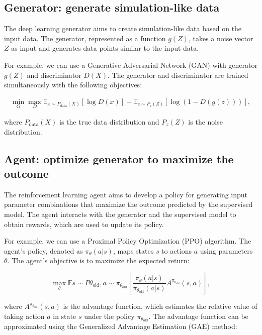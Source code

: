 \documentclass{article}
\begin{document}
\subsection{Generator: generate simulation-like data}

The deep learning generator aims to create simulation-like data based on the input data. The generator, represented as a function $g(Z)$, takes a noise vector $Z$ as input and generates data points similar to the input data.

For example, we can use a Generative Adversarial Network (GAN) with generator $g(Z)$ and discriminator $D(X)$. The generator and discriminator are trained simultaneously with the following objectives:

\begin{align}
    \min_G \max_D \mathbb{E}_{x \sim P_\text{data}(X)}[\log D(x)] + \mathbb{E}_{z \sim P_z(Z)}[\log (1 - D(g(z)))],
\end{align}

where $P_\text{data}(X)$ is the true data distribution and $P_z(Z)$ is the noise distribution.

\subsection{Agent: optimize generator to maximize the outcome}

The reinforcement learning agent aims to develop a policy for generating input parameter combinations that maximize the outcome predicted by the supervised model. The agent interacts with the generator and the supervised model to obtain rewards, which are used to update its policy.

For example, we can use a Proximal Policy Optimization (PPO) algorithm. The agent's policy, denoted as $\pi_\theta(a|s)$, maps states $s$ to actions $a$ using parameters $\theta$. The agent's objective is to maximize the expected return:

\begin{equation}
    \max_\theta \mathbb{E}{s \sim P{\theta_{\text{old}}}, a \sim \pi_{\theta_{\text{old}}}}\left[\frac{\pi_\theta(a|s)}{\pi_{\theta_{\text{old}}}(a|s)} A^{\pi_{\theta_{\text{old}}}}(s, a)\right],
\end{equation}

where $A^{\pi_{\theta_{\text{old}}}}(s, a)$ is the advantage function, which estimates the relative value of taking action $a$ in state $s$ under the policy $\pi_{\theta_{\text{old}}}$. The advantage function can be approximated using the Generalized Advantage Estimation (GAE) method:
\end{document}
